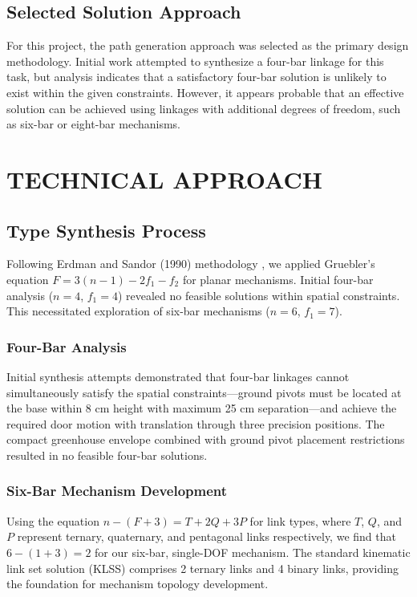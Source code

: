 \documentclass[12pt]{article}
\begin{document}
\subsection*{Selected Solution Approach}
For this project, the path generation approach was selected as the primary design methodology. Initial work attempted to synthesize a four-bar linkage for this task, but analysis indicates that a satisfactory four-bar solution is unlikely to exist within the given constraints. However, it appears probable that an effective solution can be achieved using linkages with additional degrees of freedom, such as six-bar or eight-bar mechanisms.

\section*{TECHNICAL APPROACH}

\subsection*{Type Synthesis Process}

Following Erdman and Sandor (1990) methodology \cite{Erdman1990}, we applied Gruebler's equation $F = 3(n-1) - 2f_1 - f_2$ for planar mechanisms. Initial four-bar analysis ($n=4$, $f_1=4$) revealed no feasible solutions within spatial constraints. This necessitated exploration of six-bar mechanisms ($n=6$, $f_1=7$).

\subsubsection*{Four-Bar Analysis}
Initial synthesis attempts demonstrated that four-bar linkages cannot simultaneously satisfy the spatial constraints—ground pivots must be located at the base within 8 cm height with maximum 25 cm separation—and achieve the required door motion with translation through three precision positions. The compact greenhouse envelope combined with ground pivot placement restrictions resulted in no feasible four-bar solutions.

\subsubsection*{Six-Bar Mechanism Development}
Using the equation $n-(F+3)=T+2Q+3P$ for link types, where $T$, $Q$, and $P$ represent ternary, quaternary, and pentagonal links respectively, we find that $6-(1+3)=2$ for our six-bar, single-DOF mechanism. The standard kinematic link set solution (KLSS) comprises 2 ternary links and 4 binary links, providing the foundation for mechanism topology development.
\end{document}
